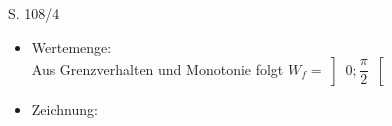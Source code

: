\begin{Exercise}{S. 108/4}{}
\begin{enumerate}
\begin{enumerate}[label=\alph*),leftmargin=*]
{\begin{itemize}[leftmargin=*]
{\begin{minipage}[t]{0.4\linewidth}
\begin{align*}
                            x_{1} &= 0 \ \text{\textit{(e)}}&&\\[-2.0ex]
                        \end{align*}
                    \end{minipage}
                    \hfill
                    \begin{minipage}[t]{0.55\linewidth}
                        \vspace{-2.0ex}
                        \begin{align*}
                            n(x) > 0
                        \end{align*}
                    \end{minipage}
                    \\[2.0ex]
                    $\Rightarrow \qquad G_{f}$ ist linksgekrümmt in $\left] \ -\infty; 0 \ \right]$ \\[1.0ex]
                    $\Rightarrow \qquad G_{f}$ ist rechtsgekrümmt in $\left[ \ 0; +\infty \ \right[$\\[2.0ex]
                    $W_{1} \left( 0 \ / \ \dfrac{\pi}{4} \right)$\\[-2.0ex]
                    }
                \item Wertemenge: \\[1.0ex]{
                    Aus Grenzverhalten und Monotonie folgt $W_{f} = \left] \ 0; \dfrac{\pi}{2} \ \right[$
                }
                \item Zeichnung: \\[-2.0ex]{
                    \raisebox{-\height}{
                    \begin{tikzpicture}[
                            declare function={
                                f_f(\x) = rad(atan(exp(\x*\xScale)))*(1/\yScale);
                            }
                        ]


\end{tikzpicture}}}
\end{itemize}}
\end{enumerate}
\end{enumerate}
\end{Exercise}

